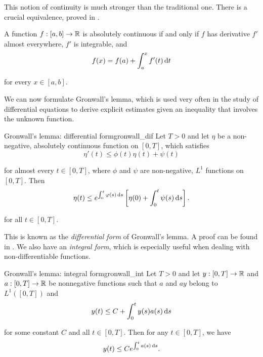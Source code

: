 This notion of continuity is much stronger than the traditional one. There is a crucial equivalence, proved in \cite{nielsen97}.

\begin{proposition}{}{}
    A function $f: [a, b] \to \mathbb{R}$ is absolutely continuous if and only if $f$ has derivative $f'$ almost everywhere, $f'$ is integrable, and
%
    \begin{equation*}
        f(x) = f(a) + \int_{a}^{x} f'(t) \mathop{}\!\mathrm{d} t
    \end{equation*}

    for every $x \in [a, b]$.
\end{proposition}

We can now formulate Gronwall's lemma, which is used very often in the study of differential equations to derive explicit estimates given an inequality that involves the unknown function.

\begin{lemma}{Gronwall's lemma: differential form}{gronwall_dif}
    Let $T > 0$ and let $\eta$ be a non-negative, absolutely continuous function on $[0, T]$, which satisfies
    \begin{equation*}
        \eta'(t) \leq \phi(t) \eta(t) + \psi(t)
    \end{equation*}
    
    \noindent
    for almost every $t \in [0, T]$, where $\phi$ and $\psi$ are non-negative, $L^1$ functions on $[0, T]$. Then
%
    \begin{equation*}
        \eta(t) \leq e^{\int_{0}^{t} \varphi(s) \mathop{}\!\mathrm{d} s} \left[ \eta(0) + \int_{0}^{t} \psi(s) \mathop{}\!\mathrm{d} s \right] .
    \end{equation*}

    \noindent
    for all $t \in [0, T]$.
\end{lemma}

This is known as the \emph{differential form} of Gronwall's lemma. A proof can be found in \cite{evans2010partial}. We also have an \emph{integral form}, which is especially useful when dealing with non-differentiable functions. 

\begin{lemma}{Gronwall's lemma: integral form}{gronwall_int}
    Let $T > 0$ and let $y: [0, T] \to \mathbb{R}$ and $a: [0, T] \to \mathbb{R}$ be nonnegative functions such that $a$ and $ay$ belong to $L^1([0, T])$ and
%
    \begin{equation*}
        y(t) \leq C + \int_{0}^{t} y(s)a(s) \mathop{}\!\mathrm{d} s
    \end{equation*}

    \noindent
    for some constant $C$ and all $t \in [0, T]$. Then for any $t \in [0, T]$, we have
%
    \begin{equation*}
        y(t) \leq C e^{\int_{0}^{t} a(s) \mathop{}\!\mathrm{d} s} .
    \end{equation*}
\end{lemma}

